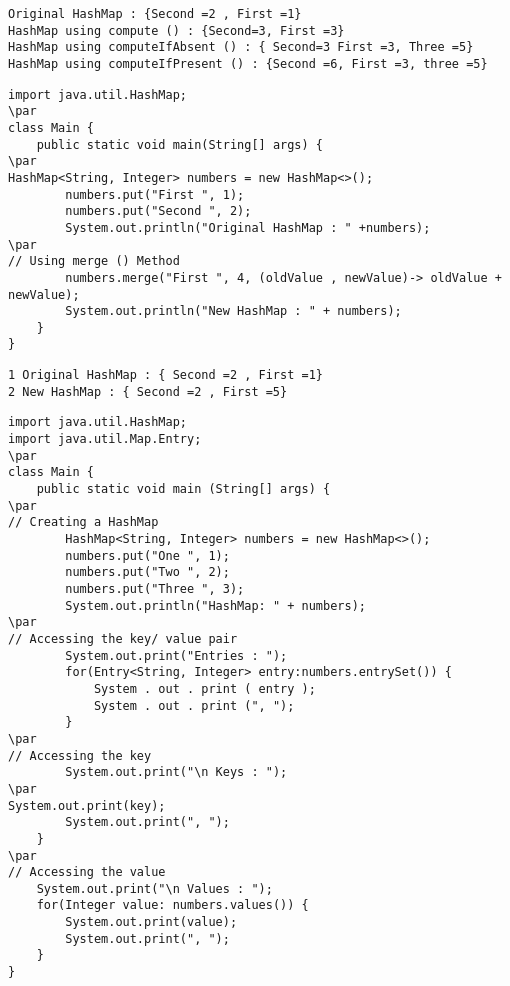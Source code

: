 \documentclass{book}
\def\lthtmlcheckvsize{\ifdim\ht\sizebox<\vsize 
  \ifdim\wd\sizebox<\hsize\expandafter\hfill\fi \expandafter\vfill
  \else\expandafter\vss\fi}%
\begin{document}
{\newpage\clearpage
{}%
\begin{lstlisting}
Original HashMap : {Second =2 , First =1}
HashMap using compute () : {Second=3, First =3}
HashMap using computeIfAbsent () : { Second=3 First =3, Three =5}
HashMap using computeIfPresent () : {Second =6, First =3, three =5}
\end{lstlisting}%
\lthtmlfigureZ
\lthtmlcheckvsize\clearpage}

{\newpage\clearpage
{}%
\begin{lstlisting}
import java.util.HashMap;
\par
class Main {
	public static void main(String[] args) {
\par
HashMap<String, Integer> numbers = new HashMap<>();
		numbers.put("First ", 1);
		numbers.put("Second ", 2);
		System.out.println("Original HashMap : " +numbers);
\par
// Using merge () Method
		numbers.merge("First ", 4, (oldValue , newValue)-> oldValue + newValue);
		System.out.println("New HashMap : " + numbers);
	}
}
\end{lstlisting}%
\lthtmlfigureZ
\lthtmlcheckvsize\clearpage}

{\newpage\clearpage
{}%
\begin{lstlisting}
1 Original HashMap : { Second =2 , First =1}
2 New HashMap : { Second =2 , First =5}
\end{lstlisting}%
\lthtmlfigureZ
\lthtmlcheckvsize\clearpage}

{\newpage\clearpage
{}%
\begin{lstlisting}
import java.util.HashMap;
import java.util.Map.Entry;
\par
class Main {
	public static void main (String[] args) {
\par
// Creating a HashMap
		HashMap<String, Integer> numbers = new HashMap<>();
		numbers.put("One ", 1);
		numbers.put("Two ", 2);
		numbers.put("Three ", 3);
		System.out.println("HashMap: " + numbers);
\par
// Accessing the key/ value pair
		System.out.print("Entries : ");
		for(Entry<String, Integer> entry:numbers.entrySet()) {
			System . out . print ( entry );
			System . out . print (", ");
		}
\par
// Accessing the key
		System.out.print("\n Keys : ");
\par
System.out.print(key);
		System.out.print(", ");
	}
\par
// Accessing the value
	System.out.print("\n Values : ");
	for(Integer value: numbers.values()) {
		System.out.print(value);
		System.out.print(", ");
	}
}
\end{lstlisting}%
\lthtmlfigureZ
\lthtmlcheckvsize\clearpage}
\end{document}
